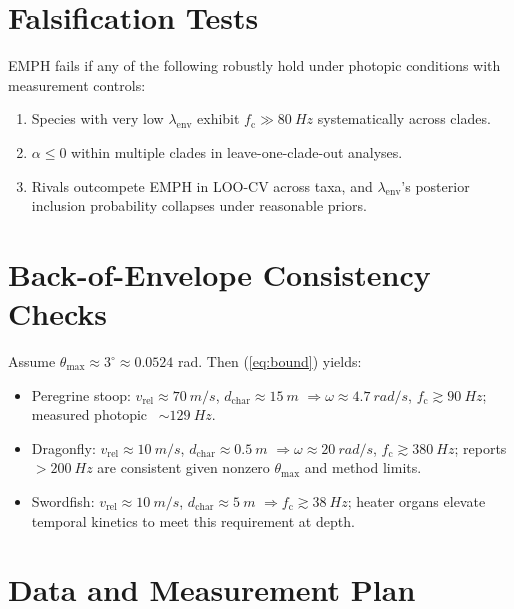 \documentclass[11pt]{article}
\newcommand{\fc}{f_{\mathrm{c}}}             %
\newcommand{\cff}{\mathrm{CFF}}               %
\newcommand{\vrel}{v_{\mathrm{rel}}}          %
\newcommand{\dchar}{d_{\mathrm{char}}}        %
\newcommand{\lamenv}{\lambda_{\mathrm{env}}}  %
\newcommand{\thetamax}{\theta_{\max}}         %
\begin{document}
\section{Falsification Tests}
EMPH fails if any of the following robustly hold under photopic conditions with measurement controls:
\begin{enumerate}[leftmargin=1.5em]
\item Species with very low $\lamenv$ exhibit $\fc \gg \SI{80}{Hz}$ systematically across clades.
\item $\alpha \le 0$ within multiple clades in leave-one-clade-out analyses.
\item Rivals outcompete EMPH in LOO-CV across taxa, and $\lamenv$'s posterior inclusion probability collapses under reasonable priors.
\end{enumerate}

\section{Back-of-Envelope Consistency Checks}
Assume $\thetamax \approx 3^\circ \approx 0.0524$ rad. Then (\ref{eq:bound}) yields:
\begin{itemize}[leftmargin=1.25em]
\item Peregrine stoop: $\vrel \approx \SI{70}{m/s}$, $\dchar \approx \SI{15}{m}$ $\Rightarrow \omega\approx \SI{4.7}{rad/s}$, $\fc \gtrsim \SI{90}{Hz}$; measured photopic \cff\ $\sim\SI{129}{Hz}$. \citep{Potier2020}
\item Dragonfly: $\vrel \approx \SI{10}{m/s}$, $\dchar \approx \SI{0.5}{m}$ $\Rightarrow \omega\approx \SI{20}{rad/s}$, $\fc \gtrsim \SI{380}{Hz}$; reports $>\SI{200}{Hz}$ are consistent given nonzero $\thetamax$ and method limits. \citep{InsectCFFReview}
\item Swordfish: $\vrel \approx \SI{10}{m/s}$, $\dchar \approx \SI{5}{m}$ $\Rightarrow \fc \gtrsim \SI{38}{Hz}$; heater organs elevate temporal kinetics to meet this requirement at depth. \citep{SwordfishHeaters}
\end{itemize}

\section{Data and Measurement Plan}
\end{document}
